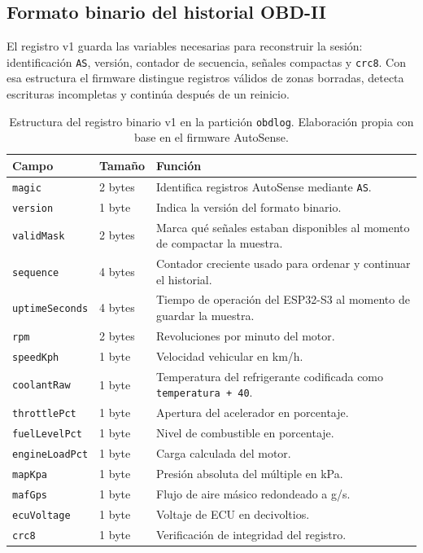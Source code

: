 \documentclass[12pt,letterpaper]{report}
\begin{document}
\subsection{Formato binario del historial OBD-II}

El registro v1 guarda las variables necesarias para reconstruir la sesión: identificación \texttt{AS}, versión, contador de secuencia, señales compactas y \texttt{crc8}. Con esa estructura el firmware distingue registros válidos de zonas borradas, detecta escrituras incompletas y continúa después de un reinicio.

\begin{table}[!htbp]
\centering
\small
\caption{Estructura del registro binario v1 en la partición \texttt{obdlog}. Elaboración propia con base en el firmware AutoSense.}
\label{tab:obdlog-record}
\setlength{\tabcolsep}{3pt}
\begin{tabular}{@{}p{} p{} p{}@{}}
\toprule
\textbf{Campo} & \textbf{Tamaño} & \textbf{Función} \\
\midrule
\texttt{magic} & 2 bytes & Identifica registros AutoSense mediante \texttt{AS}. \\
\texttt{version} & 1 byte & Indica la versión del formato binario. \\
\texttt{validMask} & 2 bytes & Marca qué señales estaban disponibles al momento de compactar la muestra. \\
\texttt{sequence} & 4 bytes & Contador creciente usado para ordenar y continuar el historial. \\
\texttt{uptimeSeconds} & 4 bytes & Tiempo de operación del ESP32-S3 al momento de guardar la muestra. \\
\texttt{rpm} & 2 bytes & Revoluciones por minuto del motor. \\
\texttt{speedKph} & 1 byte & Velocidad vehicular en km/h. \\
\texttt{coolantRaw} & 1 byte & Temperatura del refrigerante codificada como \texttt{temperatura + 40}. \\
\texttt{throttlePct} & 1 byte & Apertura del acelerador en porcentaje. \\
\texttt{fuelLevelPct} & 1 byte & Nivel de combustible en porcentaje. \\
\texttt{engineLoadPct} & 1 byte & Carga calculada del motor. \\
\texttt{mapKpa} & 1 byte & Presión absoluta del múltiple en kPa. \\
\texttt{mafGps} & 1 byte & Flujo de aire másico redondeado a g/s. \\
\texttt{ecuVoltage} & 1 byte & Voltaje de ECU en decivoltios. \\
\texttt{crc8} & 1 byte & Verificación de integridad del registro. \\
\bottomrule
\end{tabular}
\end{table}
\end{document}
